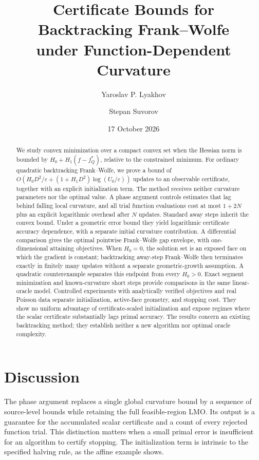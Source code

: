 \documentclass[a4paper,11pt]{article}
\title{Certificate Bounds for Backtracking Frank--Wolfe\\under Function-Dependent Curvature}
\author{Yaroslav P. Lyakhov \and Stepan Suvorov}
\date{17 October 2026}
\begin{document}
\maketitle
\begin{abstract}
We study convex minimization over a compact convex set when the Hessian
norm is bounded by $H_0+H_1(f-f_Q^*)$, relative to the constrained minimum.
For ordinary quadratic backtracking Frank--Wolfe, we prove a bound of
$O(H_0D^2/\varepsilon+(1+H_1D^2)\log(U_0/\varepsilon))$ updates to an
observable certificate, together with an explicit initialization term.
The method receives neither curvature parameters nor the optimal value.
A phase argument controls estimates that lag behind falling local
curvature, and all trial function evaluations cost at most $1+2N$ plus
an explicit logarithmic overhead after $N$ updates. Standard away steps
inherit the convex bound. Under a geometric error bound they yield
logarithmic certificate accuracy dependence, with a separate initial
curvature contribution. A differential comparison gives the optimal
pointwise Frank--Wolfe gap envelope, with one-dimensional attaining
objectives. When $H_0=0$, the solution set is an exposed face on which
the gradient is constant; backtracking away-step Frank--Wolfe then
terminates exactly in finitely many updates without a separate
geometric-growth assumption. A quadratic counterexample separates
this endpoint from every $H_0>0$.
Exact segment minimization and known-curvature
short steps provide comparisons in the same linear-oracle model.
Controlled experiments with analytically verified objectives and real
Poisson data separate initialization, active-face geometry, and stopping
cost. They show no uniform advantage of certificate-scaled initialization
and expose regimes where the scalar certificate substantially lags
primal accuracy. The results concern an existing backtracking method;
they establish neither a new algorithm nor optimal oracle complexity.
\end{abstract}







\section{Discussion}
The phase argument replaces a single global curvature bound by a sequence
of source-level bounds while retaining the full feasible-region LMO.
Its output is a guarantee for the accumulated scalar certificate and a
count of every rejected function trial. This distinction matters when a
small primal error is insufficient for an algorithm to certify stopping.
The initialization term is intrinsic to the specified halving rule,
as the affine example shows.
\end{document}
